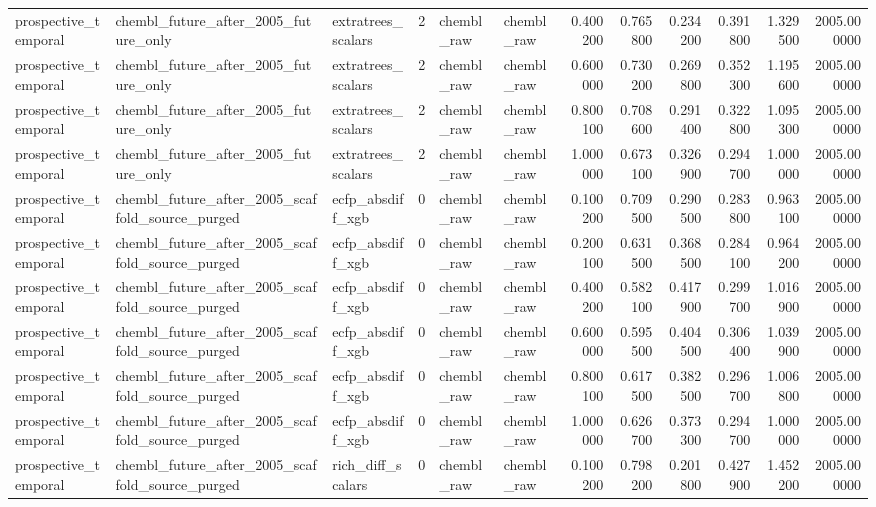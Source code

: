 \begin{longtable}{lllrllrrrrrr}
prospective\_temporal & chembl\_future\_after\_2005\_future\_only & extratrees\_scalars & 2 & chembl\_raw & chembl\_raw & 0.400200 & 0.765800 & 0.234200 & 0.391800 & 1.329500 & 2005.000000 \\
prospective\_temporal & chembl\_future\_after\_2005\_future\_only & extratrees\_scalars & 2 & chembl\_raw & chembl\_raw & 0.600000 & 0.730200 & 0.269800 & 0.352300 & 1.195600 & 2005.000000 \\
prospective\_temporal & chembl\_future\_after\_2005\_future\_only & extratrees\_scalars & 2 & chembl\_raw & chembl\_raw & 0.800100 & 0.708600 & 0.291400 & 0.322800 & 1.095300 & 2005.000000 \\
prospective\_temporal & chembl\_future\_after\_2005\_future\_only & extratrees\_scalars & 2 & chembl\_raw & chembl\_raw & 1.000000 & 0.673100 & 0.326900 & 0.294700 & 1.000000 & 2005.000000 \\
prospective\_temporal & chembl\_future\_after\_2005\_scaffold\_source\_purged & ecfp\_absdiff\_xgb & 0 & chembl\_raw & chembl\_raw & 0.100200 & 0.709500 & 0.290500 & 0.283800 & 0.963100 & 2005.000000 \\
prospective\_temporal & chembl\_future\_after\_2005\_scaffold\_source\_purged & ecfp\_absdiff\_xgb & 0 & chembl\_raw & chembl\_raw & 0.200100 & 0.631500 & 0.368500 & 0.284100 & 0.964200 & 2005.000000 \\
prospective\_temporal & chembl\_future\_after\_2005\_scaffold\_source\_purged & ecfp\_absdiff\_xgb & 0 & chembl\_raw & chembl\_raw & 0.400200 & 0.582100 & 0.417900 & 0.299700 & 1.016900 & 2005.000000 \\
prospective\_temporal & chembl\_future\_after\_2005\_scaffold\_source\_purged & ecfp\_absdiff\_xgb & 0 & chembl\_raw & chembl\_raw & 0.600000 & 0.595500 & 0.404500 & 0.306400 & 1.039900 & 2005.000000 \\
prospective\_temporal & chembl\_future\_after\_2005\_scaffold\_source\_purged & ecfp\_absdiff\_xgb & 0 & chembl\_raw & chembl\_raw & 0.800100 & 0.617500 & 0.382500 & 0.296700 & 1.006800 & 2005.000000 \\
prospective\_temporal & chembl\_future\_after\_2005\_scaffold\_source\_purged & ecfp\_absdiff\_xgb & 0 & chembl\_raw & chembl\_raw & 1.000000 & 0.626700 & 0.373300 & 0.294700 & 1.000000 & 2005.000000 \\
prospective\_temporal & chembl\_future\_after\_2005\_scaffold\_source\_purged & rich\_diff\_scalars & 0 & chembl\_raw & chembl\_raw & 0.100200 & 0.798200 & 0.201800 & 0.427900 & 1.452200 & 2005.000000 \\

\end{longtable}
